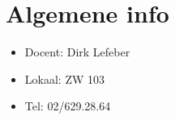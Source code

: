 \documentclass[12pt]{article}
\begin{document}
    \maketitle

    \section{Algemene info}%
    \label{sec:Algemene_info}
    \begin{itemize}
    	\item Docent: Dirk Lefeber
		\item Lokaal: ZW 103
		\item Tel: 02/629.28.64
    \end{itemize}
\end{document}
